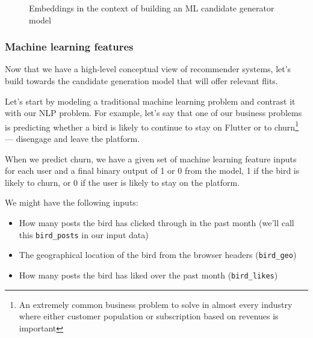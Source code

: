 \documentclass[11pt, table]{diazessay} %
\begin{document}
\begin{sloppypar}
\begin{figure}[H]
\caption{Embeddings in the context of building an ML candidate generator model}
\end{figure}


\subsubsection{Machine learning features}

Now that we have a high-level conceptual view of recommender systems, let's build towards the candidate generation model that will offer relevant flits.

Let's start by modeling a traditional machine learning problem and contrast it with our NLP problem. For example, let's say that one of our business problems is predicting whether a bird is likely to continue to stay on Flutter or to churn\footnote{An extremely common business problem to solve in almost every industry where either customer population or subscription based on revenues is important} --- disengage and leave the platform.

When we predict churn, we have a given set of machine learning feature inputs for each user and a final binary output of 1 or 0 from the model, 1 if the bird is likely to churn, or 0 if the user is likely to stay on the platform.

We might have the following inputs:

\begin{itemize}
  \item How many posts the bird has clicked through in the past month (we'll call this \texttt{bird_posts} in our input data)
  \item The geographical location of the bird from the browser headers (\texttt{bird_geo})
  \item How many posts the bird has liked over the past month (\texttt{bird_likes})
\end{itemize}




\end{sloppypar}
\end{document}
